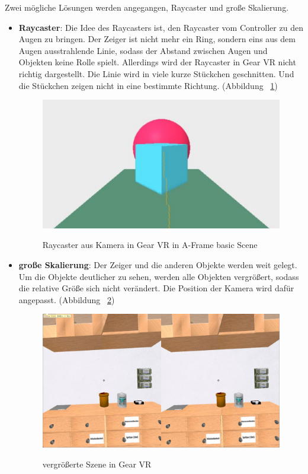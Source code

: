   Zwei mögliche Lösungen werden angegangen, Raycaster und große Skalierung.
  \begin{itemize}
      \item \textbf{Raycaster}: Die Idee des Raycasters ist, den Raycaster vom Controller zu den Augen zu bringen. Der Zeiger ist nicht mehr ein Ring, sondern eins aus dem Augen ausstrahlende Linie, sodass der Abstand zwischen Augen und Objekten keine Rolle spielt. Allerdings wird der Raycaster in Gear VR nicht richtig dargestellt. Die Linie wird in viele kurze Stückchen geschnitten. Und die Stückchen zeigen nicht in eine bestimmte Richtung. (Abbildung ~\ref{fig:GearVRRaycaster})
      
\begin{figure}[ht]
\vspace*{1em}
\centering
\caption[Raycaster in Gear VR]{Raycaster aus Kamera in Gear VR in A-Frame basic Scene}
\includegraphics[width=\textwidth]{images/gearVRRaycaster.png}
\label{fig:GearVRRaycaster} 
\end{figure}
      
      \item \textbf{große Skalierung}: Der Zeiger und die anderen Objekte werden weit gelegt. Um die Objekte deutlicher zu sehen, werden alle Objekten vergrößert, sodass die relative Größe sich nicht verändert. Die Position der Kamera wird dafür angepasst.
      (Abbildung ~\ref{fig:GearVRCursor})
      
\begin{figure}[t]
\vspace*{1em}
\centering
\caption[vergrößerte Szene in Gear VR]{vergrößerte Szene in Gear VR}
\includegraphics[width=\textwidth]{images/gearVRCursor.png}
\label{fig:GearVRCursor} 
\end{figure}
      
  \end{itemize}
  
